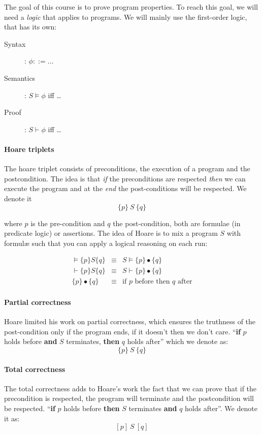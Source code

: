 \documentclass[12pt, a4paper]{book}
\begin{document}
The goal of this course is to prove program properties. To reach this goal, we
will need a \textit{logic} that applies to programs. We will mainly use the
first-order logic, that has its own:

\begin{description}
    \item[Syntax]: $\phi ::= \ldots$
    \item[Semantics]: $S \vDash\phi$ iff \ldots
    \item[Proof]: $S \vdash\phi$ iff \ldots
\end{description}

\paragraph{Hoare triplets} The hoare triplet consists of preconditions, the
execution of a program and the postcondition. The idea is that \textit{if} the
preconditions are respected \textit{then} we can execute the program and at the
\textit{end} the post-conditions will be respected. We denote it
$$\{p\}\ S\ \{q\}$$

where $p$ is the pre-condition and $q$ the post-condition, both are formulae
(in predicate logic) or assertions. The idea of Hoare is to mix a program $S$
with formul\ae{} such that you can apply a logical reasoning on each run:

\begin{eqnarray}
    \vDash \{p\} S \{q\} & \equiv & S \vDash \{p\} \bullet \{q\} \\
    \vdash \{p\} S \{q\} & \equiv & S \vdash \{p\} \bullet \{q\} \\
    \{p\} \bullet \{q\} & \equiv & \textrm{if } p \textrm{ before then } q
    \textrm{ after}
\end{eqnarray}

\paragraph{Partial correctness} Hoare limited his work on partial correctness,
which ensures the truthness of the post-condition only if the program ends, if
it doesn't then we don't care. \enquote{\textbf{if} $p$ holds before
\textbf{and} $S$ terminates, \textbf{then} $q$ holds after} which we denote as:
$$
\{p\}\ S\ \{q\}
$$

\paragraph{Total correctness} The total correctness adds to Hoare's work the
fact that we can prove that if the precondition is respected, the program will
terminate and the postcondition will be respected. \enquote{\textbf{if} $p$
holds before \textbf{then} $S$ terminates \textbf{and} $q$ holds after}. We
denote it as:
$$
[p]\ S\ [q]
$$
\end{document}
